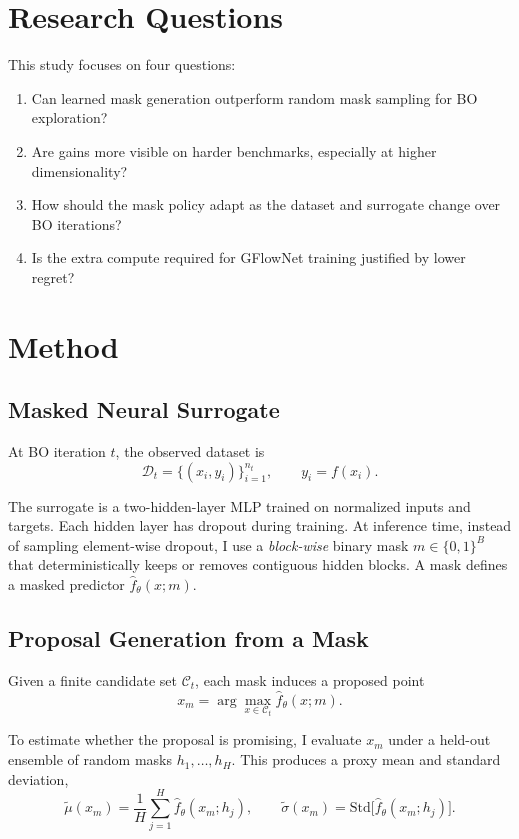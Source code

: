 \documentclass{article}
\begin{document}
\section{Research Questions}

This study focuses on four questions:

\begin{enumerate}
    \item Can learned mask generation outperform random mask sampling for BO exploration?
    \item Are gains more visible on harder benchmarks, especially at higher dimensionality?
    \item How should the mask policy adapt as the dataset and surrogate change over BO iterations?
    \item Is the extra compute required for GFlowNet training justified by lower regret?
\end{enumerate}

\section{Method}

\subsection{Masked Neural Surrogate}

At BO iteration $t$, the observed dataset is
\[
\mathcal{D}_t = \{(x_i, y_i)\}_{i=1}^{n_t}, \qquad y_i = f(x_i).
\]

The surrogate is a two-hidden-layer MLP trained on normalized inputs and targets. Each hidden layer has dropout during training. At inference time, instead of sampling element-wise dropout, I use a \emph{block-wise} binary mask $m \in \{0,1\}^B$ that deterministically keeps or removes contiguous hidden blocks. A mask defines a masked predictor $\hat f_\theta(x; m)$.

\subsection{Proposal Generation from a Mask}

Given a finite candidate set $\mathcal{C}_t$, each mask induces a proposed point
\[
x_m = \arg\max_{x \in \mathcal{C}_t} \hat f_\theta(x; m).
\]

To estimate whether the proposal is promising, I evaluate $x_m$ under a held-out ensemble of random masks $h_1,\dots,h_H$. This produces a proxy mean and standard deviation,
\[
\tilde\mu(x_m) = \frac{1}{H}\sum_{j=1}^H \hat f_\theta(x_m; h_j),
\qquad
\tilde\sigma(x_m) = \mathrm{Std}\big[\hat f_\theta(x_m; h_j)\big].
\]
\end{document}
